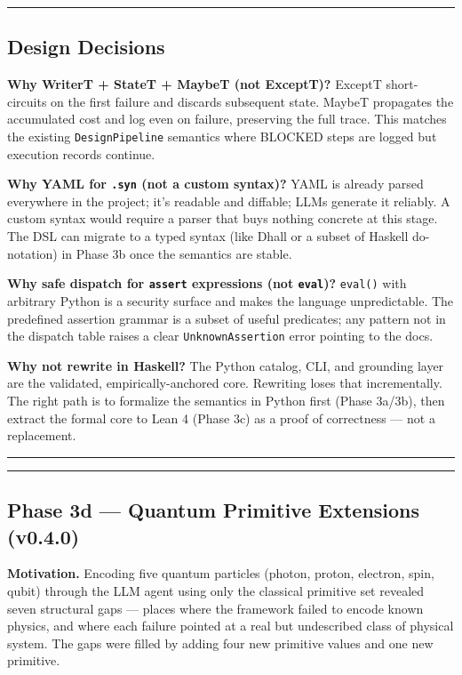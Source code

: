 \documentclass[12pt,a4paper]{article}
\begin{document}
\begin{center}
\rule{0.5\textwidth}{0.4pt}
\end{center}

\subsection{Design Decisions}

\textbf{Why WriterT + StateT + MaybeT (not ExceptT)?}
ExceptT short-circuits on the first failure and discards subsequent state. MaybeT propagates the accumulated cost and log even on failure, preserving the full trace. This matches the existing \texttt{DesignPipeline} semantics where BLOCKED steps are logged but execution records continue.

\textbf{Why YAML for \texttt{.syn} (not a custom syntax)?}
YAML is already parsed everywhere in the project; it's readable and diffable; LLMs generate it reliably. A custom syntax would require a parser that buys nothing concrete at this stage. The DSL can migrate to a typed syntax (like Dhall or a subset of Haskell do-notation) in Phase 3b once the semantics are stable.

\textbf{Why safe dispatch for \texttt{assert} expressions (not \texttt{eval})?}
\texttt{eval()} with arbitrary Python is a security surface and makes the language unpredictable. The predefined assertion grammar is a subset of useful predicates; any pattern not in the dispatch table raises a clear \texttt{UnknownAssertion} error pointing to the docs.

\textbf{Why not rewrite in Haskell?}
The Python catalog, CLI, and grounding layer are the validated, empirically-anchored core. Rewriting loses that incrementally. The right path is to formalize the semantics in Python first (Phase 3a/3b), then extract the formal core to Lean 4 (Phase 3c) as a proof of correctness --- not a replacement.

\begin{center}
\rule{0.5\textwidth}{0.4pt}
\end{center}

\begin{center}
\rule{0.5\textwidth}{0.4pt}
\end{center}

\subsection{Phase 3d --- Quantum Primitive Extensions (v0.4.0)}

\textbf{Motivation.} Encoding five quantum particles (photon, proton, electron, spin, qubit) through the LLM agent using only the classical primitive set revealed seven structural gaps --- places where the framework failed to encode known physics, and where each failure pointed at a real but undescribed class of physical system. The gaps were filled by adding four new primitive values and one new primitive.
\end{document}
